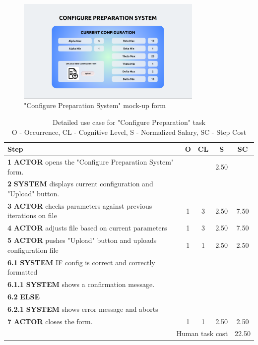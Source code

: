 \begin{figure}[H]
\centering
\includegraphics[width=0.8\textwidth]{figures/ui_configure_preparation.png}
\caption{"Configure Preparation System" mock-up form}
\end{figure}

\begin{table}[H]
\centering
\begin{tabularx}{\textwidth}{|X|c|c|c|c|}
\hline
\textbf{Step} & \textbf{O} & \textbf{CL} & \textbf{S} & \textbf{SC} \\
\hline
\textbf{1} \textbf{ACTOR} opens the "Configure Preparation System" form. &  & & 2.50 & \\
\hline
\textbf{2} \textbf{SYSTEM} displays current configuration and "Upload" button. & & & & \\
\hline
\textbf{3} \textbf{ACTOR} checks parameters against previous iterations on file & 1 & 3 & 2.50 & 7.50 \\
\hline
\textbf{4} \textbf{ACTOR} adjusts file based on current parameters & 1 & 3 & 2.50 & 7.50 \\
\hline
\textbf{5} \textbf{ACTOR} pushes "Upload" button and uploads configuration file & 1 & 1 & 2.50 & 2.50 \\
\hline
\textbf{6.1} \textbf{SYSTEM} IF config is correct and correctly formatted & & & & \\
\hline
\textbf{6.1.1} \textbf{SYSTEM} shows a confirmation message. & & & & \\
\hline
\textbf{6.2} \textbf{ELSE} & & & & \\
\hline
\textbf{6.2.1} \textbf{SYSTEM} shows error message and aborts & & & & \\
\hline
\textbf{7} \textbf{ACTOR} closes the form. & 1 & 1 & 2.50 & 2.50 \\
\hline
\multicolumn{4}{|r|}{Human task cost} & 22.50 \\
\hline
\end{tabularx}

\caption{Detailed use case for "Configure Preparation" task\\ 
O - Occurrence, CL - Cognitive Level, S - Normalized Salary, SC - Step Cost}
\label{table:configure_preparation_system}
\end{table}